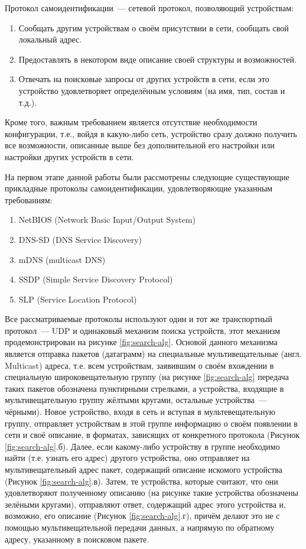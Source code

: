 Протокол самоидентификации~--- сетевой протокол, позволяющий устройствам:
\begin{enumerate}
	\item Сообщать другим устройствам о своём присутствии в сети, сообщать свой локальный адрес.
	\item Предоставлять в некотором виде описание своей структуры и возможностей.
	\item Отвечать на поисковые запросы от других устройств в сети, если это устройство удовлетворяет определённым условиям (на имя, тип, состав и т.д.).
\end{enumerate}

Кроме того, важным требованием является отсутствие необходимости конфигурации, т.е., войдя в какую-либо сеть, устройство сразу должно получить все возможности, описанные выше без дополнительной его настройки или настройки других устройств в сети.

На первом этапе данной работы были рассмотрены следующие существующие прикладные протоколы самоидентификации, удовлетворяющие указанным требованиям:
\begin{enumerate}
	\item NetBIOS (Network Basic Input/Output System)
	\item DNS-SD (DNS Service Discovery)
	\item mDNS (multicast DNS)
	\item SSDP (Simple Service Discovery Protocol)
	\item SLP (Service Location Protocol)
\end{enumerate}

Все рассматриваемые протоколы используют один и тот же транспортный протокол~--- UDP и одинаковый механизм поиска устройств, этот механизм продемонстрирован на рисунке \ref{fig:search-alg}.
Основой данного механизма является отправка пакетов (датаграмм) на специальные мультивещательные (англ. Multicast) адреса, т.е. всем устройствам, заявившим о своём вхождении в специальную широковещательную группу (на рисунке \ref{fig:search-alg} передача таких пакетов обозначена пунктирными стрелками, а устройства, входящие в мультивещательную группу жёлтыми кругами, остальные устройства~--- чёрными).
Новое устройство, входя в сеть и вступая в мультевещательную группу, отправляет устройствам в этой группе информацию о своём появлении в сети и своё описание, в форматах, зависящих от конкретного протокола (Рисунок \ref{fig:search-alg}.б).
Далее, если какому-либо устройству в группе необходимо найти (т.е. узнать его адрес) другого устройства, оно отправляет на мультивещательный адрес пакет, содержащий описание искомого устройства (Рисунок \ref{fig:search-alg}.в).
Затем, те устройства, которые считают, что они удовлетворяют полученному описанию (на рисунке такие устройства обозначены зелёными кругами), отправляют ответ, содержащий адрес этого устройства и, возможно, его описание (Рисунок \ref{fig:search-alg}.г), причём делают это не с помощью мультивещательной передачи данных, а напрямую по обратному адресу, указанному в поисковом пакете.

